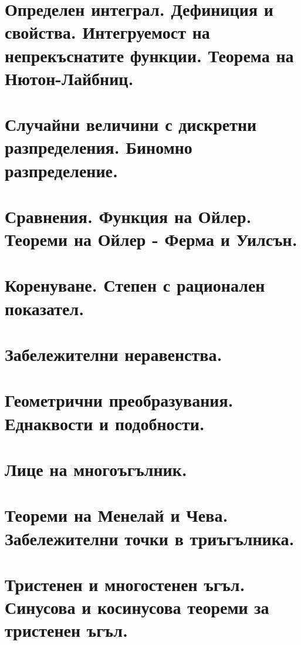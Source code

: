 \chapter{Определен интеграл. Дефиниция и свойства. Интегруемост на непрекъснатите
функции. Теорема на Нютон-Лайбниц.}
\chapter{Случайни величини с дискретни разпределения. Биномно разпределение.}
\chapter{Сравнения. Функция на Ойлер. Теореми на Ойлер - Ферма и Уилсън.}
\chapter{Коренуване. Степен с рационален показател.}
\chapter{Забележителни неравенства.}
\chapter{Геометрични преобразувания. Еднаквости и подобности.}
\chapter{Лице на многоъгълник.}
\chapter{Теореми на Менелай и Чева. Забележителни точки в триъгълника.}
\chapter{Тристенен и многостенен ъгъл. Синусова и косинусова теореми за тристенен
ъгъл.}